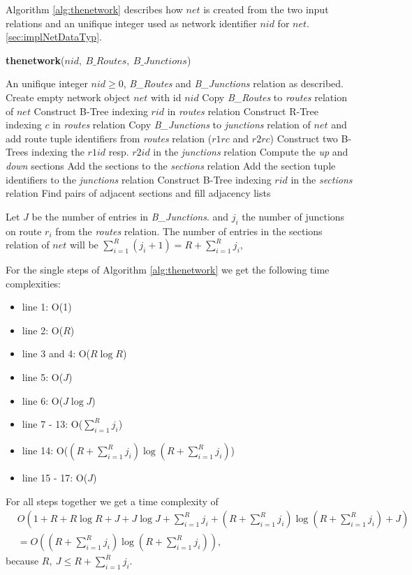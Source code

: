 \documentclass[a4paper]{article}
\newcommand{\op}[1]{\textbf{#1}}
\begin{document}
Algorithm \ref{alg:thenetwork} describes how $net$ is created from the two input
relations and an unifique integer used as network identifier $nid$ for $net$.
\ref{sec:implNetDataTyp}.
\begin{algorithm}[htbp]
\caption{\op{thenetwork}($nid,\ B\_Routes,\ B\_Junctions$)}
\label{alg:thenetwork}
\begin{algorithmic}[1]
\REQUIRE An unifique integer $nid \geq 0$, \textit{B\_Routes} and \textit{B\_Junctions}
relation as described.
\STATE Create empty network object $net$ with id $nid$
\STATE Copy \textit{B\_Routes} to \textit{routes} relation of $net$
\STATE Construct B-Tree indexing $rid$ in \textit{routes} relation
\STATE Construct R-Tree indexing $c$ in \textit{routes} relation
\STATE Copy \textit{B\_Junctions} to \textit{junctions} relation of $net$ and add route tuple
identifiers from \textit{routes} relation ($r1rc$ and $r2rc$)
\STATE Construct two B-Trees indexing the $r1id$ resp. $r2id$ in the
\textit{junctions} relation
    \STATE Compute the \textit{up} and \textit{down} sections
    \STATE Add the sections to the \textit{sections} relation
    \STATE Add the section tuple identifiers to the \textit{junctions} relation
  \ENDFOR
\ENDFOR
\STATE Construct B-Tree indexing $rid$ in the \textit{sections} relation
  \STATE Find pairs of adjacent sections and fill adjacency lists
\ENDFOR
\end{algorithmic}
\end{algorithm}
Let $J$ be the number of entries in \textit{B\_Junctions}. and $j_i$ the number of
junctions on route $r_i$ from the \textit{routes} relation. The number of entries in
the sections relation of $net$ will be $\sum_{i=1}^{R}({j_i + 1}) = R +
\sum_{i=1}^{R}{j_i}$,

For the single steps of Algorithm \ref{alg:thenetwork} we get the following time
complexities:
\begin{itemize}
  \item[] line 1: O(1)
  \item[] line 2: O($R$)
  \item[] line 3 and 4: O($R \log R$)
  \item[] line 5: O($J$)
  \item[] line 6: O($J \log J$)
  \item[] line 7 - 13: O($\sum_{i=1}^{R}{j_i}$)
  \item[] line 14: O($(R + \sum_{i=1}^{R}{j_i}) \log ({R +
\sum_{i=1}^{R}{j_i}})$)
  \item[] line 15 - 17: O($J$)
\end{itemize}
For all steps together we get a time complexity of
\begin{align*}
&O(1 + R + R \log R + J + J \log J + \sum_{i=1}^{R}{j_i} + (R +
\sum_{i=1}^{R}{j_i}) \log (R + \sum_{i=1}^{R}{j_i}) + J)\\
&= O((R + \sum_{i=1}^{R}{j_i}) \log (R  + \sum_{i=1}^{R}{j_i})),
\end{align*}
because $R,\ J \leq R + \sum_{i=1}^{R}{j_i}$.
\end{document}
